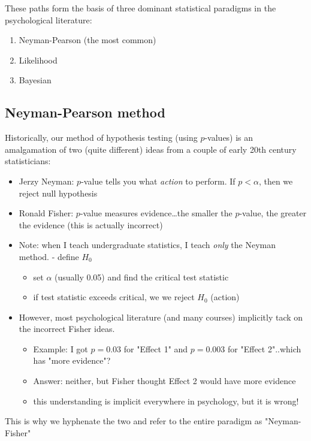 \documentclass[11pt]{article}
\begin{document}
These paths form the basis of three dominant statistical paradigms in the psychological literature:
\begin{enumerate}
\item Neyman-Pearson (the most common)
\item Likelihood
\item Bayesian
\end{enumerate}

\subsection*{Neyman-Pearson method}
\label{sec-1-1}

Historically, our method of hypothesis testing (using $p$-values) is an amalgamation of two (quite different) ideas from a couple of early 20th century statisticians:

\begin{itemize}
\item Jerzy Neyman: $p$-value tells you what \emph{action} to perform.  If $p<\alpha$, then we reject null hypothesis
\item Ronald Fisher: $p$-value measures evidence\ldots{}the smaller the $p$-value, the greater the evidence (this is actually incorrect)
\item Note: when I teach undergraduate statistics, I teach \emph{only} the Neyman method.  - define $H_0$
\begin{itemize}
\item set $\alpha$ (usually 0.05) and find the critical test statistic
\item if test statistic exceeds critical, we we reject $H_0$ (action)
\end{itemize}
\item However, most psychological literature (and many courses) implicitly tack on the incorrect Fisher ideas.  
\begin{itemize}
\item Example: I got $p=0.03$ for "Effect 1" and $p=0.003$ for "Effect 2"..which has "more evidence"?
\item Answer: neither, but Fisher thought Effect 2 would have more evidence
\item this understanding is implicit everywhere in psychology, but it is wrong!
\end{itemize}
\end{itemize}
This is why we hyphenate the two and refer to the entire paradigm as "Neyman-Fisher"
\end{document}
